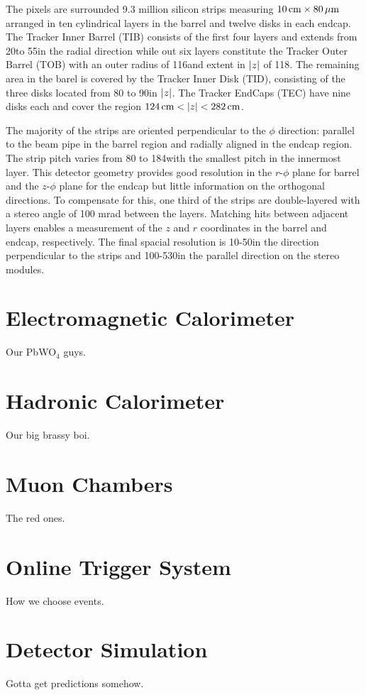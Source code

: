 The pixels are surrounded 9.3 million silicon strips measuring $10\,\text{cm}\times 80\,\mu\text{m}$ arranged in ten cylindrical layers in the barrel and twelve disks in each endcap.
The Tracker Inner Barrel (TIB) consists of the first four layers and extends from 20\cm to 55\cm in the radial direction while out six layers constitute the Tracker Outer Barrel (TOB) with an outer radius of 116\cm and extent in $\lvert z \rvert$ of 118\cm.
The remaining area in the barel is covered by the Tracker Inner Disk (TID), consisting of the three disks located from 80 to 90\cm in $\lvert z \rvert$.
The Tracker EndCaps (TEC) have nine disks each and cover the region $124\,\text{cm} < \lvert z \rvert < 282\,\text{cm}$.

The majority of the strips are oriented perpendicular to the $\phi$ direction: parallel to the beam pipe in the barrel region and radially aligned in the endcap region.
The strip pitch varies from 80 to 184\mum with the smallest pitch in the innermost layer.
This detector geometry provides good resolution in the $r$-$\phi$ plane for barrel and the $z$-$\phi$ plane for the endcap but little information on the orthogonal directions.
To compensate for this, one third of the strips are double-layered with a stereo angle of 100 mrad between the layers.
Matching hits between adjacent layers enables a measurement of the $z$ and $r$ coordinates in the barrel and endcap, respectively.
The final spacial resolution is 10-50\mum in the direction perpendicular to the strips and 100-530\mum in the parallel direction on the stereo modules.


\section{Electromagnetic Calorimeter}

Our PbWO$_{4}$ guys.

\section{Hadronic Calorimeter}

Our big brassy boi.

\section{Muon Chambers}

The red ones.

\section{Online Trigger System}

How we choose events.

\section{Detector Simulation}

Gotta get predictions somehow.



